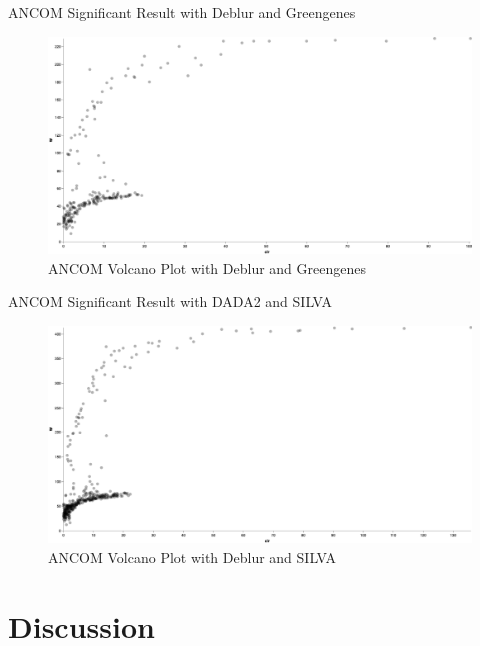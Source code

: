 \documentclass[a4paper]{article}
\begin{document}
            \begin{table}[p]
                \centering
                \caption{ANCOM Significant Result with Deblur and Greengenes}
                \label{tb:ANCOM-deblur-gg}

            \end{table}

            \begin{figure}[p]
                \centering
                \includegraphics[width=0.8 \linewidth]{figures/ANCOM/Deblur.gg.png}
                \caption{ANCOM Volcano Plot with Deblur and Greengenes}
                \label{fig:volcano-deblur-gg}
            \end{figure}

            \begin{table}[p]
                \centering
                \caption{ANCOM Significant Result with DADA2 and SILVA}
                \label{tb:ANCOM-deblur-silva}

            \end{table}

            \begin{figure}[p]
                \centering
                \includegraphics[width=0.8 \linewidth]{figures/ANCOM/Deblur.silva.png}
                \caption{ANCOM Volcano Plot with Deblur and SILVA}
                \label{fig:volcano-deblur-silva}
            \end{figure}

    \section{Discussion}

    
    
\end{document}
